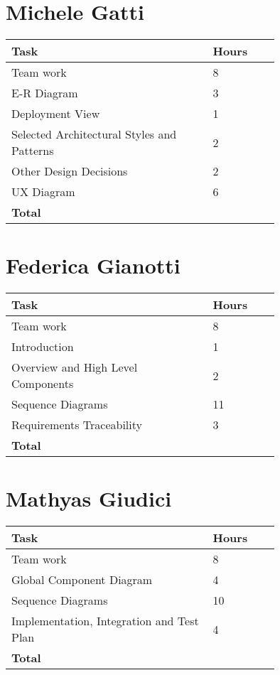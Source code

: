 \section{Michele Gatti}

\smallskip
\begin{center}
\begin{tabular}{ | p{0.75\linewidth} | l | }
  \hline
    \textbf{Task} & \textbf{Hours }\\ \hline
     Team work & 8 \\ \hline
     E-R Diagram & 3 \\ \hline
     Deployment View & 1 \\ \hline
     Selected Architectural Styles and Patterns & 2 \\ \hline
     Other Design Decisions & 2 \\ \hline
     UX Diagram & 6 \\ \hline
    \textbf{Total} & \textbf{} \\ \hline
\end{tabular}
\end{center}
\smallskip


\section{Federica Gianotti}

\smallskip
\begin{center}
\begin{tabular}{ | p{0.75\linewidth} | l | }
  \hline
    \textbf{Task} & \textbf{Hours }\\ \hline
    Team work & 8 \\ \hline
    Introduction & 1 \\ \hline
    Overview and High Level Components & 2 \\ \hline
    Sequence Diagrams & 11 \\ \hline
    Requirements Traceability & 3 \\ \hline
   \textbf{Total} & \textbf{} \\ \hline
\end{tabular}
\end{center}
\smallskip

\section{Mathyas Giudici}

\smallskip
\begin{center}
\begin{tabular}{ | p{0.75\linewidth} | l | }
  \hline
    \textbf{Task} & \textbf{Hours }\\ \hline
    Team work & 8 \\ \hline
    Global Component Diagram & 4 \\ \hline
    Sequence Diagrams & 10 \\ \hline
    Implementation, Integration and Test Plan & 4 \\ \hline
   \textbf{Total} & \textbf{} \\ \hline
\end{tabular}
\end{center}

\clearpage
